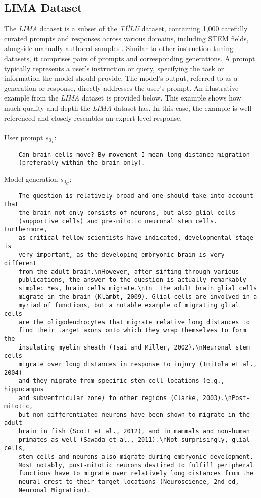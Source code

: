 \subsection{LIMA Dataset}\label{subsec:lima_dataset}
The \emph{LIMA} dataset is a subset of the \emph{TÜLU} dataset, containing 1,000 carefully curated prompts and responses across various domains, including STEM fields, alongside manually authored samples \cite{zhou2023limaalignment}. Similar to other instruction-tuning datasets, it comprises pairs of prompts and corresponding generations. A prompt typically represents a user's instruction or query, specifying the task or information the model should provide. The model's output, referred to as a generation or response, directly addresses the user's prompt. An illustrative example from the \emph{LIMA} dataset is provided below. This example shows how much quality and depth the \emph{LIMA} dataset has. In this case, the example is well-referenced and closely resembles an expert-level response.
\\\\
User prompt $s_{0_P}$:
\begin{verbatim}
    Can brain cells move? By movement I mean long distance migration 
    (preferably within the brain only).
\end{verbatim}
Model-generation $s_{0_G}$:
\begin{verbatim}
    The question is relatively broad and one should take into account that 
    the brain not only consists of neurons, but also glial cells 
    (supportive cells) and pre-mitotic neuronal stem cells. Furthermore,
    as critical fellow-scientists have indicated, developmental stage is
    very important, as the developing embryonic brain is very different 
    from the adult brain.\nHowever, after sifting through various 
    publications, the answer to the question is actually remarkably 
    simple: Yes, brain cells migrate.\nIn  the adult brain glial cells
    migrate in the brain (Klämbt, 2009). Glial cells are involved in a
    myriad of functions, but a notable example of migrating glial cells
    are the oligodendrocytes that migrate relative long distances to 
    find their target axons onto which they wrap themselves to form the
    insulating myelin sheath (Tsai and Miller, 2002).\nNeuronal stem cells
    migrate over long distances in response to injury (Imitola et al., 2004)
    and they migrate from specific stem-cell locations (e.g., hippocampus 
    and subventricular zone) to other regions (Clarke, 2003).\nPost-mitotic,
    but non-differentiated neurons have been shown to migrate in the adult 
    brain in fish (Scott et al., 2012), and in mammals and non-human 
    primates as well (Sawada et al., 2011).\nNot surprisingly, glial cells, 
    stem cells and neurons also migrate during embryonic development. 
    Most notably, post-mitotic neurons destined to fulfill peripheral 
    functions have to migrate over relatively long distances from the 
    neural crest to their target locations (Neuroscience, 2nd ed, 
    Neuronal Migration).
\end{verbatim}


